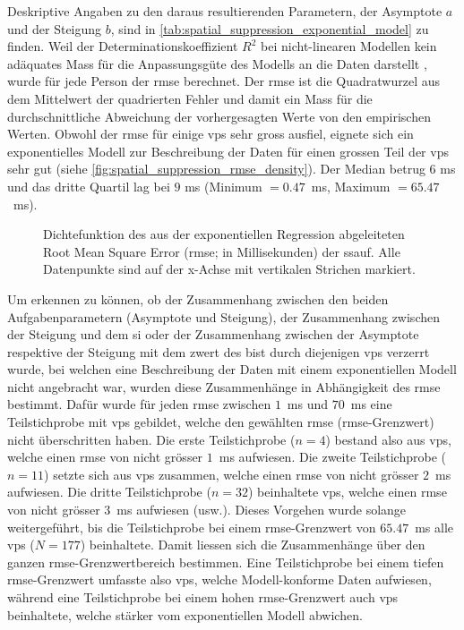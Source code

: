 \documentclass[11pt, twoside, a4paper]{book}		%
\begin{document}
Deskriptive Angaben zu den daraus resultierenden Parametern, der Asymptote $a$ und der Steigung $b$, sind in \autoref{tab:spatial_suppression_exponential_model} zu finden.
Weil der Determinationskoeffizient $R^2$ bei nicht-linearen Modellen kein adäquates Mass für die Anpassungsgüte des Modells an die Daten darstellt \citep{Spiess2010}, wurde für jede Person der \gls{rmse} berechnet. Der \gls{rmse} ist die Quadratwurzel aus dem Mittelwert der quadrierten Fehler und damit ein Mass für die durchschnittliche Abweichung der vorhergesagten Werte von den empirischen Werten. 
Obwohl der \gls{rmse} für einige \glspl{vp} sehr gross ausfiel, eignete sich ein exponentielles Modell zur Beschreibung der Daten für einen grossen Teil der \glspl{vp} sehr gut (siehe \autoref{fig:spatial_suppression_rmse_density}). Der Median betrug $6$ ms und das dritte Quartil lag bei $9$ ms (Minimum $=0.47$~ms, Maximum $=65.47$~ms).

\begin{figure}[t]
	\centering
	\begin{adjustbox}{width=1\textwidth}
		
	\end{adjustbox}
	\caption[Dichtefunktion des RMSE]{Dichtefunktion des aus der exponentiellen Regression abgeleiteten Root Mean Square Error (\gls{rmse}; in Millisekunden)  der \gls{ssauf}.  Alle Datenpunkte sind auf der x-Achse mit vertikalen Strichen markiert.}
	\label{fig:spatial_suppression_rmse_density}
\end{figure}

Um erkennen zu können, ob der Zusammenhang zwischen den beiden Aufgabenparametern (Asymptote und Steigung), der Zusammenhang zwischen der Steigung und dem \gls{si} oder der Zusammenhang zwischen der Asymptote respektive der Steigung mit dem \gls{zwert} des \gls{bist} durch diejenigen \glspl{vp} verzerrt wurde, bei welchen eine Beschreibung der Daten mit einem exponentiellen Modell nicht angebracht war, wurden diese Zusammenhänge in Abhängigkeit des \gls{rmse} bestimmt. 
Dafür wurde für jeden \gls{rmse} zwischen $1$~ms und $70$~ms eine Teilstichprobe mit \glspl{vp} gebildet, welche den gewählten \gls{rmse} (\gls{rmse}-Grenzwert) nicht überschritten haben. Die erste Teilstichprobe ($n=4$) bestand also aus \glspl{vp}, welche einen \gls{rmse} von nicht grösser $1$~ms aufwiesen. Die zweite Teilstichprobe ($n=11$) setzte sich aus \glspl{vp} zusammen, welche einen \gls{rmse} von nicht grösser $2$~ms aufwiesen. Die dritte Teilstichprobe ($n=32$) beinhaltete \glspl{vp}, welche einen \gls{rmse} von nicht grösser $3$~ms aufwiesen (usw.). Dieses Vorgehen wurde solange weitergeführt, bis die Teilstichprobe bei einem \gls{rmse}-Grenzwert von $65.47$~ms alle \glspl{vp} ($N=177$) beinhaltete. 
Damit liessen sich die Zusammenhänge über den ganzen \gls{rmse}-Grenz\-wert\-be\-reich bestimmen. Eine Teilstichprobe bei einem tiefen \gls{rmse}-Grenz\-wert umfasste also \glspl{vp}, welche Modell-konforme Daten aufwiesen, während eine Teilstichprobe bei einem hohen \gls{rmse}-Grenzwert auch \glspl{vp} beinhaltete, welche stärker vom exponentiellen Modell abwichen. 
\end{document}
